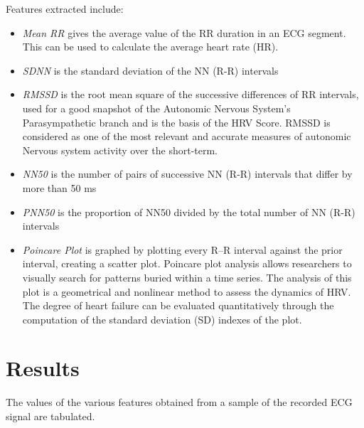\documentclass[11pt]{article}
\theoremstyle{definition}
\begin{document}
  Features extracted include:
  \begin{itemize}[topsep=1pt]
    \item[] \textit{Mean RR} gives the average value of the RR duration in an ECG segment. This can be used to calculate the average heart rate (HR).
    \item[] \textit{SDNN} is the standard deviation of the NN (R-R) intervals
    \item[] \textit{RMSSD} is the root mean square of the successive differences of RR intervals, used for a good snapshot of the Autonomic Nervous System’s Parasympathetic branch and is the basis of the HRV Score.  RMSSD is considered as one of the most relevant and accurate measures of autonomic Nervous system activity over the short-term.
    \item[] \textit{NN50} is the number of pairs of successive NN (R-R) intervals that differ by more than 50 ms
    \item[] \textit{PNN50} is the proportion of NN50 divided by the total number of NN (R-R) intervals
    \item[] \textit{Poincare Plot} is graphed by plotting every R–R interval against the prior interval, creating a scatter plot.
    Poincare plot analysis allows researchers to visually search for patterns buried within a time series.
    The analysis of this plot is a geometrical and nonlinear method to assess the dynamics of HRV.
    The degree of heart failure can be evaluated quantitatively through the computation of the standard deviation (SD) indexes of the plot\cite{hsu2012poincare}.
  \end{itemize}

  \section{Results}
  The values of the various features obtained from a sample of the recorded ECG signal are tabulated.
\end{document}
